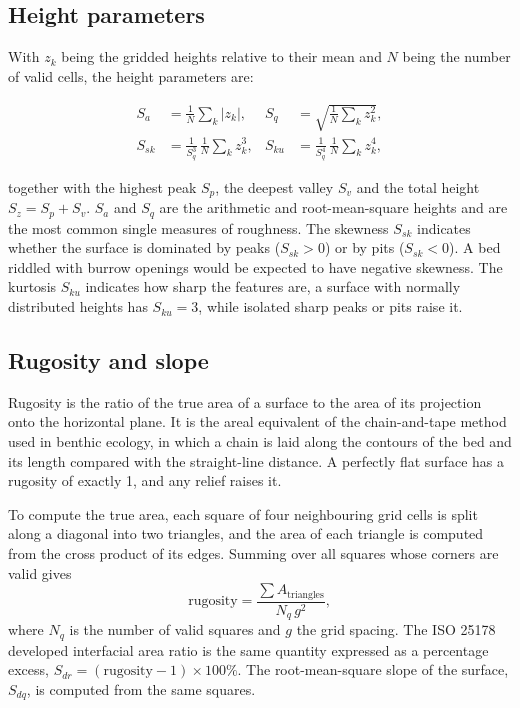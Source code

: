 \subsection{Height parameters}

With $z_k$ being the gridded heights relative to their mean and $N$ being the number of valid cells, the height parameters are:

\begin{align}
	S_a &= \frac{1}{N}\sum_{k} |z_k|, &
	S_q &= \sqrt{\frac{1}{N}\sum_{k} z_k^2}, \\
	S_{sk} &= \frac{1}{S_q^3}\,\frac{1}{N}\sum_{k} z_k^3, &
	S_{ku} &= \frac{1}{S_q^4}\,\frac{1}{N}\sum_{k} z_k^4,
\end{align}

together with the highest peak $S_p$, the deepest valley $S_v$ and the total height $S_z = S_p + S_v$. $S_a$ and $S_q$ are the arithmetic and root-mean-square heights and are the most common single measures of roughness. The skewness $S_{sk}$ indicates whether the surface is dominated by peaks ($S_{sk} > 0$) or by pits ($S_{sk} < 0$). A bed riddled with burrow openings would be expected to have negative skewness. The kurtosis $S_{ku}$ indicates how sharp the features are, a surface with normally distributed heights has $S_{ku} = 3$, while isolated sharp peaks or pits raise it.

\subsection{Rugosity and slope}

Rugosity is the ratio of the true area of a surface to the area of its projection onto the horizontal plane. It is the areal equivalent of the chain-and-tape method used in benthic ecology, in which a chain is laid along the contours of the bed and its length compared with the straight-line distance. A perfectly flat surface has a rugosity of exactly 1, and any relief raises it.

To compute the true area, each square of four neighbouring grid cells is split along a diagonal into two triangles, and the area of each triangle is computed from the cross product of its edges. Summing over all squares whose corners are valid gives
\begin{equation}
	\text{rugosity} = \frac{\sum A_{\text{triangles}}}{N_q\, g^2},
\end{equation}
where $N_q$ is the number of valid squares and $g$ the grid spacing. The ISO 25178 developed interfacial area ratio is the same quantity expressed as a percentage excess, $S_{dr} = (\text{rugosity} - 1)\times 100\%$. The root-mean-square slope of the surface, $S_{dq}$, is computed from the same squares.


